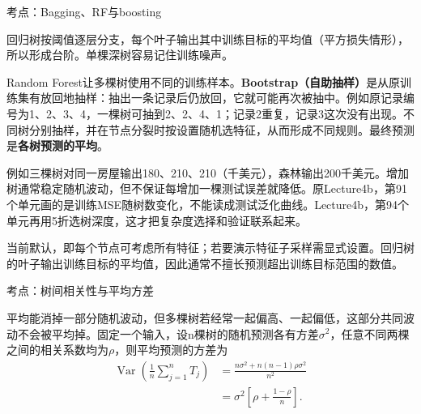 

考点：Bagging、RF与boosting
 

回归树按阈值逐层分支，每个叶子输出其中训练目标的平均值（平方损失情形），所以形成台阶。单棵深树容易记住训练噪声。


Random Forest让多棵树使用不同的训练样本。\textbf{Bootstrap（自助抽样）}是从原训练集有放回地抽样：抽出一条记录后仍放回，它就可能再次被抽中。例如原记录编号为1、2、3、4，一棵树可抽到2、2、4、1；记录2重复，记录3这次没有出现。不同树分别抽样，并在节点分裂时按设置随机选特征，从而形成不同规则。最终预测是\textbf{各树预测的平均}。


例如三棵树对同一房屋输出180、210、210（千美元），森林输出200千美元。增加树通常稳定随机波动，但不保证每增加一棵测试误差就降低。原Lecture4b，第91个单元画的是训练MSE随树数变化，不能读成测试泛化曲线。Lecture4b，第94个单元再用5折选树深度，这才把复杂度选择和验证联系起来。




当前默认，即每个节点可考虑所有特征；若要演示特征子采样需显式设置。回归树的叶子输出训练目标的平均值，因此通常不擅长预测超出训练目标范围的数值。








考点：树间相关性与平均方差

平均能消掉一部分随机波动，但多棵树若经常一起偏高、一起偏低，这部分共同波动不会被平均掉。固定一个输入，设n棵树的随机预测各有方差\(\sigma^2\)，任意不同两棵之间的相关系数均为\(\rho\)，则平均预测的方差为
\[
\begin{aligned}\operatorname{Var}\!\left(\frac1n\sum_{j=1}^n T_j\right)
&=\frac{n\sigma^2+n(n-1)\rho\sigma^2}{n^2}\\[3pt]
&=\sigma^2\left[\rho+\frac{1-\rho}{n}\right].\end{aligned}\tag{4.17}
\]


